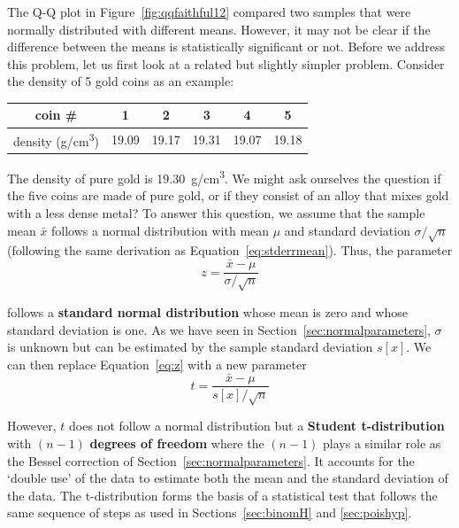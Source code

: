 The Q-Q plot in Figure~\ref{fig:qqfaithful12} compared two samples
that were normally distributed with different means.  However, it may
not be clear if the difference between the means is statistically
significant or not. Before we address this problem, let us first look
at a related but slightly simpler problem. Consider the density of 5
gold coins as an example:

\begin{center}
\begin{tabular}{c|ccccc}
  coin \# & 1 & 2 & 3 & 4 & 5 \\ \hline
  density (g/cm\textsuperscript{3}) & 19.09 & 19.17 & 19.31 & 19.07 & 19.18
  \label{tab:coins}
\end{tabular}
\end{center}

The density of pure gold is 19.30~g/cm\textsuperscript{3}. We might
ask ourselves the question if the five coins are made of pure gold, or
if they consist of an alloy that mixes gold with a less dense metal?
To answer this question, we assume that the sample mean $\bar{x}$
follows a normal distribution with mean $\mu$ and standard deviation
$\sigma/\sqrt{n}$ (following the same derivation as
Equation~\ref{eq:stderrmean}). Thus, the parameter
\begin{equation}
  z = \frac{\bar{x}-\mu}{\sigma/\sqrt{n}}
  \label{eq:z}
\end{equation}

\noindent follows a \textbf{standard normal distribution} whose mean
is zero and whose standard deviation is one. As we have seen in
Section~\ref{sec:normalparameters}, $\sigma$ is unknown but can be
estimated by the sample standard deviation $s[x]$. We can then
replace Equation~\ref{eq:z} with a new parameter
\begin{equation}
  t = \frac{\bar{x}-\mu}{s[x]/\sqrt{n}}
  \label{eq:t}
\end{equation}

However, $t$ does not follow a normal distribution but a
\textbf{Student t-distribution} with $(n-1)$ \textbf{degrees of
  freedom} where the $(n-1)$ plays a similar role as the Bessel
correction of Section~\ref{sec:normalparameters}. It accounts for the
`double use' of the data to estimate both the mean and the standard
deviation of the data. The t-distribution forms the basis of a
statistical test that follows the same sequence of steps as used in
Sections~\ref{sec:binomH} and \ref{sec:poishyp}.

